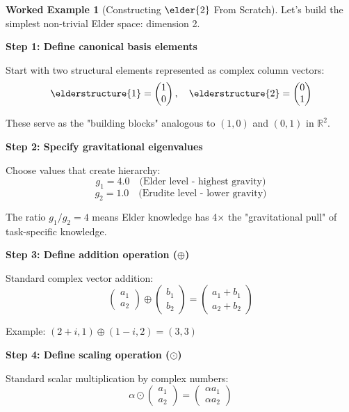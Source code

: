 \documentclass[12pt,a4paper]{book}
\theoremstyle{definition}
\newtheorem{example}{Worked Example}[section]
\theoremstyle{remark}
\begin{document}
\begin{example}[Constructing $\elder{2}$ From Scratch]
Let's build the simplest non-trivial Elder space: dimension 2.

\textbf{Step 1: Define canonical basis elements}

Start with two structural elements represented as complex column vectors:
$$\elderstructure{1} = \begin{pmatrix} 1 \\ 0 \end{pmatrix}, \quad \elderstructure{2} = \begin{pmatrix} 0 \\ 1 \end{pmatrix}$$

These serve as the "building blocks" analogous to $(1, 0)$ and $(0, 1)$ in $\mathbb{R}^2$.

\textbf{Step 2: Specify gravitational eigenvalues}

Choose values that create hierarchy:
$$g_1 = 4.0 \quad \text{(Elder level - highest gravity)}$$
$$g_2 = 1.0 \quad \text{(Erudite level - lower gravity)}$$

The ratio $g_1/g_2 = 4$ means Elder knowledge has 4× the "gravitational pull" of task-specific knowledge.

\textbf{Step 3: Define addition operation ($\oplus$)}

Standard complex vector addition:
$$\begin{pmatrix} a_1 \\ a_2 \end{pmatrix} \oplus \begin{pmatrix} b_1 \\ b_2 \end{pmatrix} = \begin{pmatrix} a_1 + b_1 \\ a_2 + b_2 \end{pmatrix}$$

Example: $(2+i, 1) \oplus (1-i, 2) = (3, 3)$

\textbf{Step 4: Define scaling operation ($\odot$)}

Standard scalar multiplication by complex numbers:
$$\alpha \odot \begin{pmatrix} a_1 \\ a_2 \end{pmatrix} = \begin{pmatrix} \alpha a_1 \\ \alpha a_2 \end{pmatrix}$$


\end{example}
\end{document}

